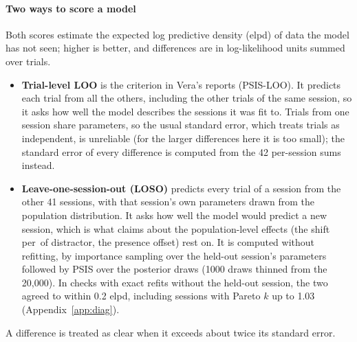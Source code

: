 \paragraph{Two ways to score a model}
Both scores estimate the expected log predictive density (elpd) of data the model has not seen; higher is better, and differences are in log-likelihood units summed over trials.
\begin{itemize}
\item \textbf{Trial-level LOO} is the criterion in Vera's reports (PSIS-LOO). It predicts each trial from all the others, including the other trials of the same session, so it asks how well the model describes the sessions it was fit to.
Trials from one session share parameters, so the usual standard error, which treats trials as independent, is unreliable (for the larger differences here it is too small); the standard error of every difference is computed from the 42 per-session sums instead.
\item \textbf{Leave-one-session-out (LOSO)} predicts every trial of a session from the other 41 sessions, with that session's own parameters drawn from the population distribution.
It asks how well the model would predict a new session, which is what claims about the population-level effects (the shift per\um\ of distractor, the presence offset) rest on.
It is computed without refitting, by importance sampling over the held-out session's parameters followed by PSIS over the posterior draws (1000 draws thinned from the 20,000).
In checks with exact refits without the held-out session, the two agreed to within 0.2 elpd, including sessions with Pareto $k$ up to 1.03 (Appendix~\ref{app:diag}).
\end{itemize}
A difference is treated as clear when it exceeds about twice its standard error.
